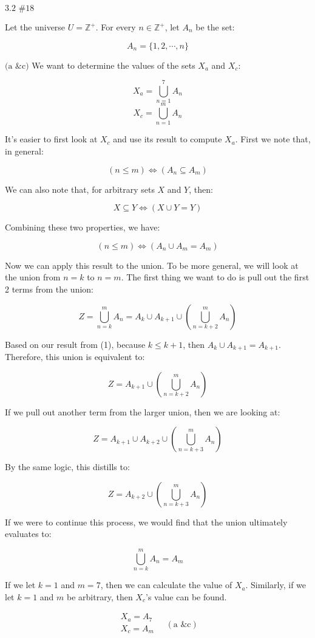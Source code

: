 \documentclass{article}
\newcommand{\problem}[2]{$\boxed{\text{#1 \##2}}$}
\newcommand{\subproblem}[1]{$\boxed{\text{(#1)}}$}
\newcommand{\subsolution}[2]{\boxed{#2\quad(\text{#1})}}
\begin{document}
\begin{multicols*}{2}
%
\problem{3.2}{18}

Let the universe $U=\mathbb{Z}^+$. For every $n\in\mathbb{Z}^+$, let
$A_n$ be the set:

\[
A_n=\{1,2,\cdots,n\}
\]

%
\subproblem{a \& c} We want to determine the values of the sets $X_a$
and $X_c$:

\[
X_a=\bigcup\limits_{n=1}^7 A_n
\] \[
X_c=\bigcup\limits_{n=1}^m A_n
\]

It's easier to first look at $X_c$ and use its result to compute
$X_a$. First we note that, in general:

\[
(n \le m)\Leftrightarrow(A_n\subseteq A_m)
\]

We can also note that, for arbitrary sets $X$ and $Y$, then:

\[
X\subseteq Y \Leftrightarrow (X\cup Y=Y)
\]

Combining these two properties, we have:

\[\tag{1}
(n\le m)\Leftrightarrow(A_n\cup A_m=A_m)
\]

Now we can apply this result to the union. To be more general, we will
look at the union from $n=k$ to $n=m$. The first thing we want to do
is pull out the first 2 terms from the union:

\[
Z = \bigcup\limits_{n=k}^m A_n = A_k\cup A_{k+1}\cup\left(\bigcup\limits_{n=k+2}^m A_n\right)
\]

Based on our result from (1), because $k\le{}k+1$, then
$A_k\cup{}A_{k+1}=A_{k+1}$. Therefore, this union is equivalent to:

\[
Z = A_{k+1}\cup\left(\bigcup\limits_{n=k+2}^m A_n\right)
\]

If we pull out another term from the larger union, then we are looking
at:

\[
Z = A_{k+1}\cup{}A_{k+2}\cup\left(\bigcup\limits_{n=k+3}^m A_n\right)
\]

By the same logic, this distills to:

\[
Z = A_{k+2}\cup\left(\bigcup\limits_{n=k+3}^m A_n\right)
\]

If we were to continue this process, we would find that the union
ultimately evaluates to:

\[
\bigcup\limits_{n=k}^m A_n = A_m
\]

If we let $k=1$ and $m=7$, then we can calculate the value of
$X_a$. Similarly, if we let $k=1$ and $m$ be arbitrary, then $X_c$'s
value can be found.

\[
\subsolution{a \& c}{\begin{array}{l}
X_a=A_7 \\
X_c=A_m \\
\end{array}}
\]


\end{multicols*}
\end{document}
